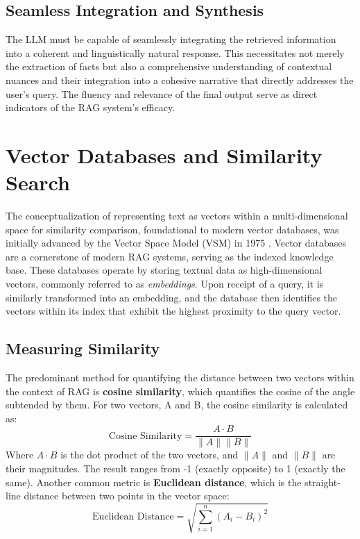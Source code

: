 \subsection{Seamless Integration and Synthesis}
The LLM must be capable of seamlessly integrating the retrieved information into a coherent and linguistically natural response. This necessitates not merely the extraction of facts but also a comprehensive understanding of contextual nuances and their integration into a cohesive narrative that directly addresses the user's query. The fluency and relevance of the final output serve as direct indicators of the RAG system's efficacy.

\section{Vector Databases and Similarity Search}
The conceptualization of representing text as vectors within a multi-dimensional space for similarity comparison, foundational to modern vector databases, was initially advanced by the Vector Space Model (VSM) in 1975 \autocite{salton1975vector}. Vector databases are a cornerstone of modern RAG systems, serving as the indexed knowledge base. These databases operate by storing textual data as high-dimensional vectors, commonly referred to as \textit{embeddings}. Upon receipt of a query, it is similarly transformed into an embedding, and the database then identifies the vectors within its index that exhibit the highest proximity to the query vector.



\subsection{Measuring Similarity}
The predominant method for quantifying the distance between two vectors within the context of RAG is \textbf{cosine similarity}, which quantifies the cosine of the angle subtended by them. For two vectors, A and B, the cosine similarity is calculated as:
\begin{equation}
\text{Cosine Similarity} = \frac{A \cdot B}{\|A\| \|B\|}
\end{equation}
Where \(A \cdot B\) is the dot product of the two vectors, and \(\|A\|\) and \(\|B\|\) are their magnitudes. The result ranges from -1 (exactly opposite) to 1 (exactly the same).
Another common metric is \textbf{Euclidean distance}, which is the straight-line distance between two points in the vector space:
\begin{equation}
\text{Euclidean Distance} = \sqrt{\sum_{i=1}^{n} (A_i - B_i)^2}
\end{equation}

